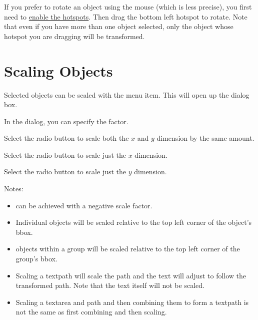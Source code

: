 If you prefer to rotate an \gls{object} using the mouse (which is
less precise), you first need to \hyperref[mi:hotspots]{enable the hotspots}.
Then drag the bottom left hotspot to rotate. Note that even if you
have more than one object selected, only the object whose hotspot you
are dragging will be transformed.



\section{Scaling Objects}\label{sec:scaleobjects}


Selected \glspl{object} can be scaled with the
 menu item. This will open up the
 dialog box.


In the  dialog, you can specify the
 factor.


Select the  radio button to scale both the
$x$ and $y$ dimension by the same amount.


Select the  radio button to scale just the
$x$ dimension.


Select the  radio button to scale just the
$y$ dimension.

Notes:
\begin{itemize}
\item {} can be
achieved with a negative scale factor.

\item Individual \glspl*{object} will be
scaled relative to the top left corner of the
object's \gls{bbox}.

\item \Glspl*{object} within a
\gls{group} will be scaled relative to the top left corner
of the group's \gls*{bbox}.

\item Scaling a \gls{textpath} will scale the path and the text
will adjust to follow the transformed path. Note that the text
itself will not be scaled.

\item Scaling a \gls*{textarea} and \gls*{path} and then combining
them to form a \gls*{textpath} is not the same as first combining
and then scaling.
\end{itemize}

